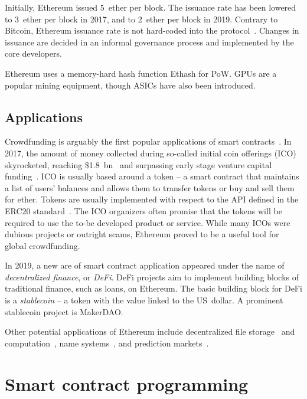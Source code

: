 Initially, Ethereum issued $5$~ether per block.
The issuance rate has been lowered to $3$~ether per block in 2017, and to $2$~ether per block in 2019.
Contrary to Bitcoin, Ethereum issuance rate is not hard-coded into the protocol~\cite{Ethhub2020}.
Changes in issuance are decided in an informal governance process and implemented by the core developers.

Ethereum uses a memory-hard hash function Ethash for PoW.
GPUs are a popular mining equipment, though ASICs have also been introduced.


\subsection{Applications}

Crowdfunding is arguably the first popular applications of smart contracts~\cite{McAdams2017}.
In 2017, the amount of money collected during so-called initial coin offerings (ICO) skyrocketed, reaching \$1.8~bn~\cite{CoindeakICOTracker} and surpassing early stage venture capital funding~\cite{Sunnarborg2017}.
ICO is usually based around a token -- a smart contract that maintains a list of users' balances and allows them to transfer tokens or buy and sell them for ether.
Tokens are usually implemented with respect to the API defined in the ERC20 standard~\cite{Victor2019}.
The ICO organizers often promise that the tokens will be required to use the to-be developed product or service.
While many ICOs were dubious projects or outright scams, Ethereum proved to be a useful tool for global crowdfunding.

In 2019, a new are of smart contract application appeared under the name of \textit{decentralized finance}, or \textit{DeFi}.
DeFi projects aim to implement building blocks of traditional finance, such as loans, on Ethereum.
The basic building block for DeFi is a \textit{stablecoin} -- a token with the value linked to the US~dollar.
A prominent stablecoin project is MakerDAO.

Other potential applications of Ethereum include decentralized file storage~\cite{Storj} and computation~\cite{Golem}, name systems~\cite{ENS}, and prediction markets~\cite{Augur, Gnosis}.


\section{Smart contract programming}

